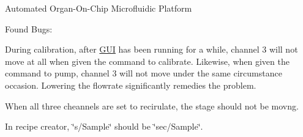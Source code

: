 Automated Organ-\/\+On-\/\+Chip Microfluidic Platform

Found Bugs\+:
\begin{DoxyItemize}
\item During calibration, after \mbox{\hyperlink{namespace_g_u_i}{G\+UI}} has been running for a while, channel 3 will not move at all when given the command to calibrate. Likewise, when given the command to pump, channel 3 will not move under the same circumstance occasion. Lowering the flowrate significantly remedies the problem.
\end{DoxyItemize}

When all three cheannels are set to recirulate, the stage should not be movng.

In recipe creator, \char`\"{}s/\+Sample\char`\"{} should be \char`\"{}sec/\+Sample\char`\"{}. 